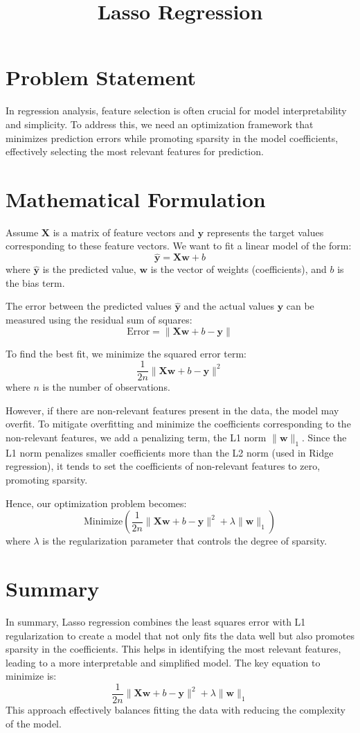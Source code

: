 \documentclass{article}
\title{Lasso Regression}
\date{}
\begin{document}
\maketitle

\section*{Problem Statement}

In regression analysis, feature selection is often crucial for model interpretability and simplicity. To address this, we need an optimization framework that minimizes prediction errors while promoting sparsity in the model coefficients, effectively selecting the most relevant features for prediction.

\section*{Mathematical Formulation}

Assume $\mathbf{X}$ is a matrix of feature vectors and $\mathbf{y}$ represents the target values corresponding to these feature vectors. We want to fit a linear model of the form:
\[
\hat{\mathbf{y}} = \mathbf{X}\mathbf{w} + b
\]
where $\hat{\mathbf{y}}$ is the predicted value, $\mathbf{w}$ is the vector of weights (coefficients), and $b$ is the bias term.

The error between the predicted values $\hat{\mathbf{y}}$ and the actual values $\mathbf{y}$ can be measured using the residual sum of squares:
\[
\text{Error} = \|\mathbf{X}\mathbf{w} + b - \mathbf{y}\|
\]

To find the best fit, we minimize the squared error term:
\[
\frac{1}{2n} \|\mathbf{X}\mathbf{w} + b - \mathbf{y}\|^2
\]
where $n$ is the number of observations.

However, if there are non-relevant features present in the data, the model may overfit. To mitigate overfitting and minimize the coefficients corresponding to the non-relevant features, we add a penalizing term, the L1 norm $\|\mathbf{w}\|_1$. Since the L1 norm penalizes smaller coefficients more than the L2 norm (used in Ridge regression), it tends to set the coefficients of non-relevant features to zero, promoting sparsity.

Hence, our optimization problem becomes:
\[
\text{Minimize} \left( \frac{1}{2n} \|\mathbf{X}\mathbf{w} + b - \mathbf{y}\|^2 + \lambda \|\mathbf{w}\|_1 \right)
\]
where $\lambda$ is the regularization parameter that controls the degree of sparsity.

\section*{Summary}

In summary, Lasso regression combines the least squares error with L1 regularization to create a model that not only fits the data well but also promotes sparsity in the coefficients. This helps in identifying the most relevant features, leading to a more interpretable and simplified model. The key equation to minimize is:
\[
\frac{1}{2n} \|\mathbf{X}\mathbf{w} + b - \mathbf{y}\|^2 + \lambda \|\mathbf{w}\|_1
\]
This approach effectively balances fitting the data with reducing the complexity of the model.
\end{document}
